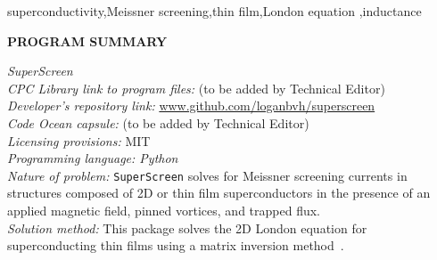 \documentclass[final,3p,times,twocolumn]{elsarticle}
\newcommand{\inline}[1]{\texttt{#1}\xspace}
\newcommand{\SuperScreen}{\inline{SuperScreen}}
\begin{document}
\begin{frontmatter}
\begin{keyword}
superconductivity\sep Meissner screening\sep thin film\sep London equation \sep inductance

\end{keyword}

\end{frontmatter}


\noindent
{\bf PROGRAM SUMMARY}

\begin{small}
\noindent
{\em SuperScreen}\\
{\em CPC Library link to program files:} (to be added by Technical Editor) \\
{\em Developer's repository link:} \href{http://www.github.com/loganbvh/superscreen}{www.github.com/loganbvh/superscreen}\\
{\em Code Ocean capsule:} (to be added by Technical Editor)\\
{\em Licensing provisions:} MIT\\
{\em Programming language: Python}\\
{\em Nature of problem:} \SuperScreen solves for Meissner screening currents in structures composed of 2D or thin film superconductors in the presence of an applied magnetic field, pinned vortices, and trapped flux.\\
{\em Solution method:} This package solves the 2D London equation for superconducting thin films using a matrix inversion method~\cite{Brandt2004-ew,Brandt2005-wj}.\\
   \\


\end{small}
\end{document}
